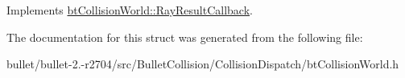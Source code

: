 Implements \hyperlink{structbt_collision_world_1_1_ray_result_callback}{bt\+Collision\+World\+::\+Ray\+Result\+Callback}.



The documentation for this struct was generated from the following file\+:\begin{DoxyCompactItemize}
\item 
bullet/bullet-\/2.-\/r2704/src/\+Bullet\+Collision/\+Collision\+Dispatch/bt\+Collision\+World.\+h\end{DoxyCompactItemize}
